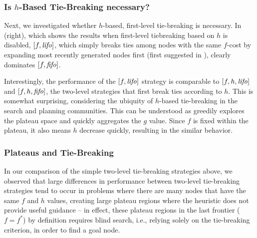 \subsubsection{Is $h$-Based Tie-Breaking necessary?}

Next, we investigated whether $h$-based, first-level tie-breaking is necessary.
In  (right), which shows the results when  first-level
tiebreaking based on $h$ is disabled, $[f, \mbox{\textit{lifo}}]$, which simply breaks ties among nodes with the same $f$-cost by expanding most recently generated nodes first (first suggested in \cite{korf1985depth}),
clearly dominates $[f, \mbox{\textit{fifo}}]$.

Interestingly, the performance of the $[f, \mbox{\textit{lifo}}]$ strategy
is comparable to $[f,h,\mbox{\textit{lifo}}]$ and $[f,h,\mbox{\textit{fifo}}]$, the two-level strategies that first break ties according to $h$.
This is somewhat surprising, considering the ubiquity of $h$-based tie-breaking in the search and planning communities.
% 
This can be understood as \lifo greedily explores the plateau space
and quickly aggregates the $g$ value. Since $f$ is fixed within the
plateau, it also means $h$ decrease quickly, resulting in the similar behavior.



\subsubsection{Plateaus and Tie-Breaking}

In our comparison of the simple two-level tie-breaking strategies
above, we observed that large differences in performance between
two-level tie-breaking strategies tend to occur in problems where
there are many nodes that have the same $f$ and $h$ values, creating
large plateau regions where the heuristic does not provide
useful guidance -- in effect, these plateau regions in the last
frontier ($f=f^*$) by definition requires blind search, i.e., 
relying solely on the tie-breaking criterion, in order to
find a goal node.

